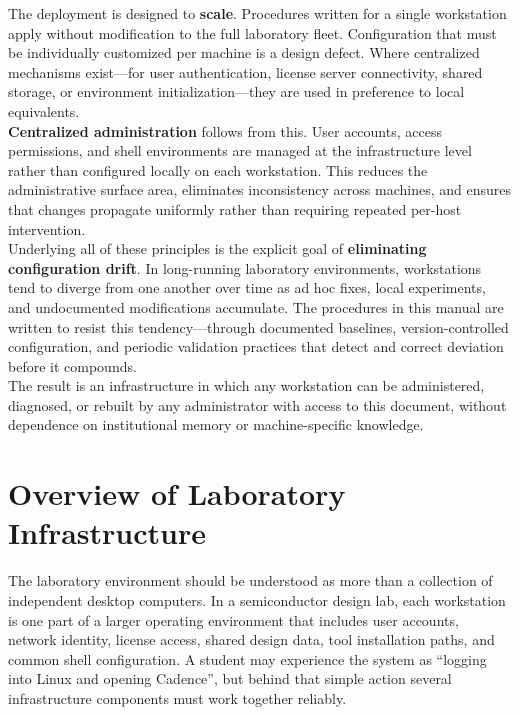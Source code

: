 The deployment is designed to \textbf{scale}. Procedures written for a single workstation apply
without modification to the full laboratory fleet. Configuration that must be individually
customized per machine is a design defect. Where centralized mechanisms exist---for user
authentication, license server connectivity, shared storage, or environment initialization---they
are used in preference to local equivalents.\\

\textbf{Centralized administration} follows from this. User accounts, access permissions, and
shell environments are managed at the infrastructure level rather than configured locally on each
workstation. This reduces the administrative surface area, eliminates inconsistency across
machines, and ensures that changes propagate uniformly rather than requiring repeated per-host
intervention.\\

Underlying all of these principles is the explicit goal of \textbf{eliminating configuration
drift}. In long-running laboratory environments, workstations tend to diverge from one another
over time as ad hoc fixes, local experiments, and undocumented modifications accumulate. The
procedures in this manual are written to resist this tendency---through documented baselines,
version-controlled configuration, and periodic validation practices that detect and correct
deviation before it compounds.\\

The result is an infrastructure in which any workstation can be administered, diagnosed, or
rebuilt by any administrator with access to this document, without dependence on institutional
memory or machine-specific knowledge.


\section{Overview of Laboratory Infrastructure}

The laboratory environment should be understood as more than a collection of independent desktop
computers. In a semiconductor design lab, each workstation is one part of a larger operating
environment that includes user accounts, network identity, license access, shared design data,
tool installation paths, and common shell configuration. A student may experience the system as
``logging into Linux and opening Cadence'', but behind that simple action several infrastructure
components must work together reliably.\\

